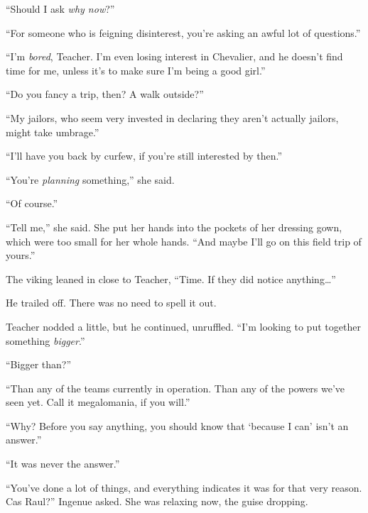 ``Should I ask \emph{why now}?''



``For someone who is feigning disinterest, you're asking an awful lot of questions.''



``I'm \emph{bored}, Teacher.  I'm even losing interest in Chevalier, and he doesn't find time for me, unless it's to make sure I'm being a good girl.''



``Do you fancy a trip, then?  A walk outside?''



``My jailors, who seem very invested in declaring they aren't actually jailors, might take umbrage.''



``I'll have you back by curfew, if you're still interested by then.''



``You're \emph{planning} something,'' she said.



``Of course.''



``Tell me,'' she said.  She put her hands into the pockets of her dressing gown, which were too small for her whole hands.  ``And maybe I'll go on this field trip of yours.''



The viking leaned in close to Teacher, ``Time.  If they did notice anything\ldots''



He trailed off.  There was no need to spell it out.



Teacher nodded a little, but he continued, unruffled.  ``I'm looking to put together something \emph{bigger}.''



``Bigger than?''



``Than any of the teams currently in operation.  Than any of the powers we've seen yet.  Call it megalomania, if you will.''



``Why?  Before you say anything, you should know that `because I can' isn't an answer.''



``It was never the answer.''



``You've done a lot of things, and everything indicates it was for that very reason.  Cas Raul?'' Ingenue asked.  She was relaxing now, the guise dropping.



